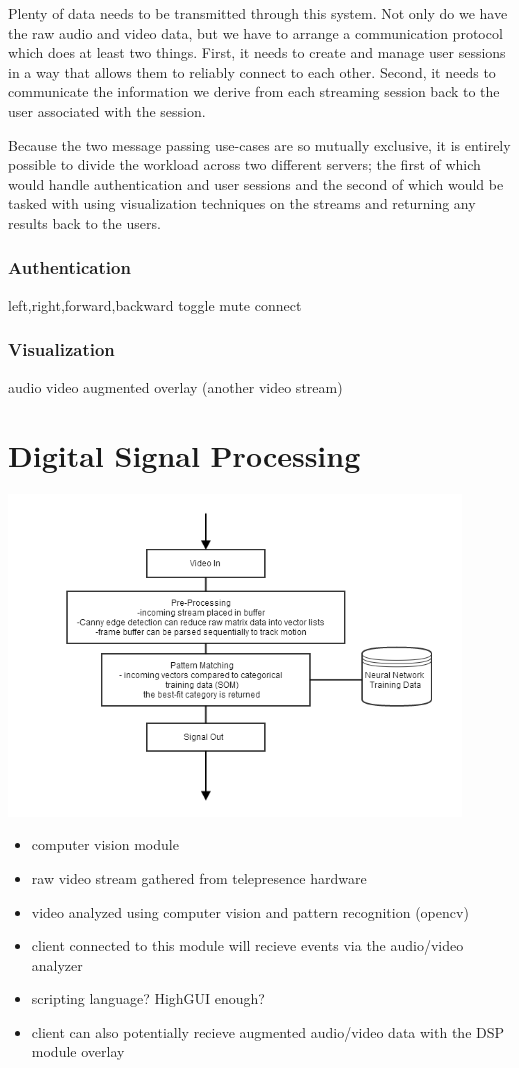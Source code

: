\documentclass[a4paper,12pt]{report}
\begin{document}
	Plenty of data needs to be transmitted through this system. Not only do we have the raw audio and video data, but we have to arrange a communication protocol which does at least two things. First, it needs to create and manage user sessions in a way that allows them to reliably connect to each other. Second, it needs to communicate the information we derive from each streaming session back to the user associated with the session.
		
	Because the two message passing use-cases are so mutually exclusive, it is entirely possible to divide the workload across two different servers; the first of which would handle authentication and user sessions and the second of which would be tasked with using visualization techniques on the streams and returning any results back to the users.
		\subsubsection{Authentication}
			left,right,forward,backward
			toggle mute
			connect
		\subsubsection{Visualization}
			audio
			video
			augmented overlay (another video stream)


\section{Digital Signal Processing}
\includegraphics[width=12cm]{signalProcessing}
\begin{itemize}
	\item computer vision module
	\item raw video stream gathered from telepresence hardware
	\item video analyzed using computer vision and pattern recognition (opencv)
	\item client connected to this module will recieve events via the audio/video analyzer
	\item scripting language? HighGUI enough?
	\item client can also potentially recieve augmented audio/video data with the DSP module overlay
\end{itemize}
	
\end{document}
